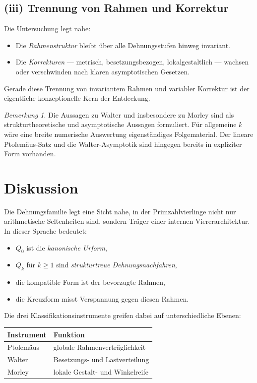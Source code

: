 \documentclass[11pt,a4paper]{article}
\theoremstyle{definition}
\theoremstyle{remark}
\newtheorem{bemerkung}[satz]{Bemerkung}
\begin{document}
\subsection*{(iii) Trennung von Rahmen und Korrektur}
Die Untersuchung legt nahe:
\begin{itemize}
\item Die \emph{Rahmenstruktur} bleibt über alle Dehnungsstufen hinweg invariant.
\item Die \emph{Korrekturen} --- metrisch, besetzungsbezogen, lokalgestaltlich --- wachsen oder verschwinden nach klaren asymptotischen Gesetzen.
\end{itemize}
Gerade diese Trennung von invariantem Rahmen und variabler Korrektur ist der eigentliche konzeptionelle Kern der Entdeckung.

\begin{bemerkung}
Die Aussagen zu Walter und insbesondere zu Morley sind als strukturtheoretische und asymptotische Aussagen formuliert. Für allgemeine $k$ wäre eine breite numerische Auswertung eigenständiges Folgematerial. Der lineare Ptolemäus-Satz und die Walter-Asymptotik sind hingegen bereits in expliziter Form vorhanden.
\end{bemerkung}

\section{Diskussion}

Die Dehnungsfamilie legt eine Sicht nahe, in der Primzahlvierlinge nicht nur arithmetische Seltenheiten sind, sondern Träger einer internen Viererarchitektur. In dieser Sprache bedeutet:
\begin{itemize}
\item $Q_0$ ist die \emph{kanonische Urform},
\item $Q_k$ für $k\ge 1$ sind \emph{strukturtreue Dehnungsnachfahren},
\item die kompatible Form ist der bevorzugte Rahmen,
\item die Kreuzform misst Verspannung gegen diesen Rahmen.
\end{itemize}

Die drei Klassifikationsinstrumente greifen dabei auf unterschiedliche Ebenen:
\begin{center}
\begin{tabular}{@{}ll@{}}
\toprule
Instrument & Funktion \\
\midrule
Ptolemäus & globale Rahmenverträglichkeit \\
Walter & Besetzungs- und Lastverteilung \\
Morley & lokale Gestalt- und Winkelreife \\
\bottomrule
\end{tabular}
\end{center}
\end{document}
